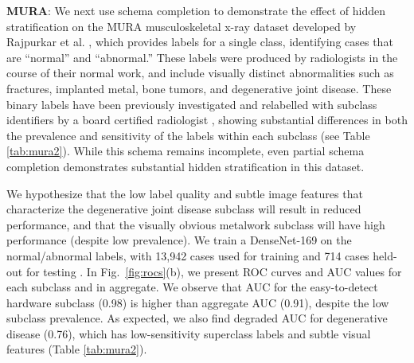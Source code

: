 \documentclass[sigconf]{acmart}
\begin{document}
\textbf{MURA}: We next use schema completion to demonstrate the effect of hidden stratification on the MURA musculoskeletal x-ray dataset developed by Rajpurkar et al. \citep{Rajpurkar2017-rc}, which provides labels for a single class, identifying cases that are ``normal'' and ``abnormal.'' 
These labels were produced by radiologists in the course of their normal work, and include visually distinct abnormalities such as fractures, implanted metal, bone tumors, and degenerative joint disease. 
These binary labels have been previously investigated and relabelled with subclass identifiers by a board certified radiologist \citep{Oakden-Rayner2019-yi}, showing substantial differences in both the prevalence and sensitivity of the labels within each subclass (see Table \ref{tab:mura2}). 
While this schema remains incomplete, even partial schema completion demonstrates substantial hidden stratification in this dataset.

We hypothesize that the low label quality and subtle image features that characterize the degenerative joint disease subclass will result in reduced performance, and that the visually obvious metalwork subclass will have high performance (despite low prevalence).
 We train a DenseNet-169 on the normal/abnormal labels, with 13,942 cases used for training and 714 cases held-out for testing \citep{Rajpurkar2017-rc}.  
 In Fig.~\ref{fig:rocs}(b), we present ROC curves and AUC values for each subclass and in aggregate.  
 We observe that AUC for the easy-to-detect hardware subclass (0.98) is higher than aggregate AUC (0.91), despite the low subclass prevalence.
 As expected, we also find degraded AUC for degenerative disease (0.76), which has low-sensitivity superclass labels and subtle visual features (Table \ref{tab:mura2}).  


 \begin{figure*}[!th!]%
\centering
{}%
%
%
\caption{ROC curves for subclasses of the (a) abnormal Adelaide Hip Fracture superclass (b) abnormal MURA superclass and (c) pneumothorax CXR14 superclass.  All subclass AUCs are significantly different than the overall task (DeLong p$<$0.05) for MURA and CXR14.  For hip fracture, the AUCs themselves are not statistically different via a two-sided test (DeLong p$>$0.05), but the sensitivities are statistically different (p$<$0.01) at the relevant operating point \citep{Gale_W_Oakden-Rayner_L_Carneiro_G_Bradley_AP_Palmer_LJ2017-tl}---see Table 2 for details. For MURA, sensitivities at 0.50 specificity are 0.93 (All), 1.00 (Hardware), 0.89 (Fracture), 0.80 (Degenerative).  For CXR14, sensitivities at 0.50 specificity are 0.94 (All), 0.99 (Drain), and 0.85 (No Drain).  For hip fracture, sensitivities at 0.50 specificity are 1.00 (All), 1.00 (Cervical), and 0.95 (Subtle)}
\label{fig:rocs}
\end{figure*}
\end{document}

